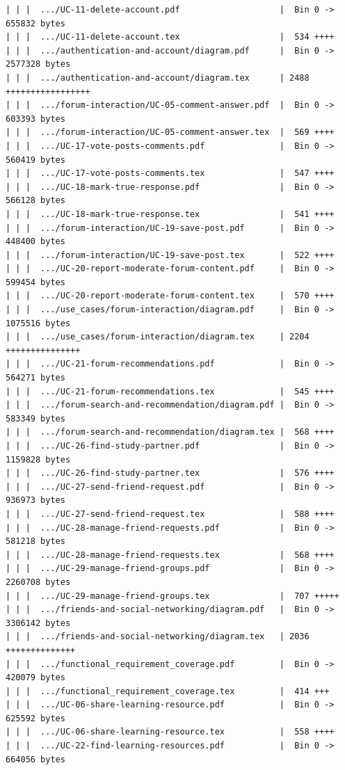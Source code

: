 \documentclass[12pt]{article}
\begin{document}
\begin{lstlisting}[numbers=none,breaklines=true]
| | |  .../UC-11-delete-account.pdf                    |  Bin 0 -> 655832 bytes
| | |  .../UC-11-delete-account.tex                    |  534 ++++
| | |  .../authentication-and-account/diagram.pdf      |  Bin 0 -> 2577328 bytes
| | |  .../authentication-and-account/diagram.tex      | 2488 +++++++++++++++++
| | |  .../forum-interaction/UC-05-comment-answer.pdf  |  Bin 0 -> 603393 bytes
| | |  .../forum-interaction/UC-05-comment-answer.tex  |  569 ++++
| | |  .../UC-17-vote-posts-comments.pdf               |  Bin 0 -> 560419 bytes
| | |  .../UC-17-vote-posts-comments.tex               |  547 ++++
| | |  .../UC-18-mark-true-response.pdf                |  Bin 0 -> 566128 bytes
| | |  .../UC-18-mark-true-response.tex                |  541 ++++
| | |  .../forum-interaction/UC-19-save-post.pdf       |  Bin 0 -> 448400 bytes
| | |  .../forum-interaction/UC-19-save-post.tex       |  522 ++++
| | |  .../UC-20-report-moderate-forum-content.pdf     |  Bin 0 -> 599454 bytes
| | |  .../UC-20-report-moderate-forum-content.tex     |  570 ++++
| | |  .../use_cases/forum-interaction/diagram.pdf     |  Bin 0 -> 1075516 bytes
| | |  .../use_cases/forum-interaction/diagram.tex     | 2204 +++++++++++++++
| | |  .../UC-21-forum-recommendations.pdf             |  Bin 0 -> 564271 bytes
| | |  .../UC-21-forum-recommendations.tex             |  545 ++++
| | |  .../forum-search-and-recommendation/diagram.pdf |  Bin 0 -> 583349 bytes
| | |  .../forum-search-and-recommendation/diagram.tex |  568 ++++
| | |  .../UC-26-find-study-partner.pdf                |  Bin 0 -> 1159828 bytes
| | |  .../UC-26-find-study-partner.tex                |  576 ++++
| | |  .../UC-27-send-friend-request.pdf               |  Bin 0 -> 936973 bytes
| | |  .../UC-27-send-friend-request.tex               |  588 ++++
| | |  .../UC-28-manage-friend-requests.pdf            |  Bin 0 -> 581218 bytes
| | |  .../UC-28-manage-friend-requests.tex            |  568 ++++
| | |  .../UC-29-manage-friend-groups.pdf              |  Bin 0 -> 2260708 bytes
| | |  .../UC-29-manage-friend-groups.tex              |  707 +++++
| | |  .../friends-and-social-networking/diagram.pdf   |  Bin 0 -> 3306142 bytes
| | |  .../friends-and-social-networking/diagram.tex   | 2036 ++++++++++++++
| | |  .../functional_requirement_coverage.pdf         |  Bin 0 -> 420079 bytes
| | |  .../functional_requirement_coverage.tex         |  414 +++
| | |  .../UC-06-share-learning-resource.pdf           |  Bin 0 -> 625592 bytes
| | |  .../UC-06-share-learning-resource.tex           |  558 ++++
| | |  .../UC-22-find-learning-resources.pdf           |  Bin 0 -> 664056 bytes

\end{lstlisting}
\end{document}
